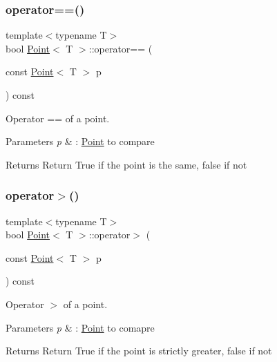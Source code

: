 \subsubsection{\texorpdfstring{operator==()}{operator==()}}
{\footnotesize\ttfamily template$<$typename T$>$ \\
bool \hyperlink{classPoint}{Point}$<$ T $>$\+::operator== (\begin{DoxyParamCaption}\item[{const \hyperlink{classPoint}{Point}$<$ T $>$}]{p }\end{DoxyParamCaption}) const\hspace{0.3cm}{\ttfamily [inline]}}



Operator == of a point. 


\begin{DoxyParams}{Parameters}
{\em p} & \+: \hyperlink{classPoint}{Point} to compare \\
\hline
\end{DoxyParams}
\begin{DoxyReturn}{Returns}
Return True if the point is the same, false if not 
\end{DoxyReturn}
\mbox{\label{classPoint_ade386be90f64de342ada7165415daf07}} 
\subsubsection{\texorpdfstring{operator$>$()}{operator>()}}
{\footnotesize\ttfamily template$<$typename T$>$ \\
bool \hyperlink{classPoint}{Point}$<$ T $>$\+::operator$>$ (\begin{DoxyParamCaption}\item[{const \hyperlink{classPoint}{Point}$<$ T $>$}]{p }\end{DoxyParamCaption}) const\hspace{0.3cm}{\ttfamily [inline]}}



Operator $>$ of a point. 


\begin{DoxyParams}{Parameters}
{\em p} & \+: \hyperlink{classPoint}{Point} to comapre \\
\hline
\end{DoxyParams}
\begin{DoxyReturn}{Returns}
Return True if the point is strictly greater, false if not 
\end{DoxyReturn}


